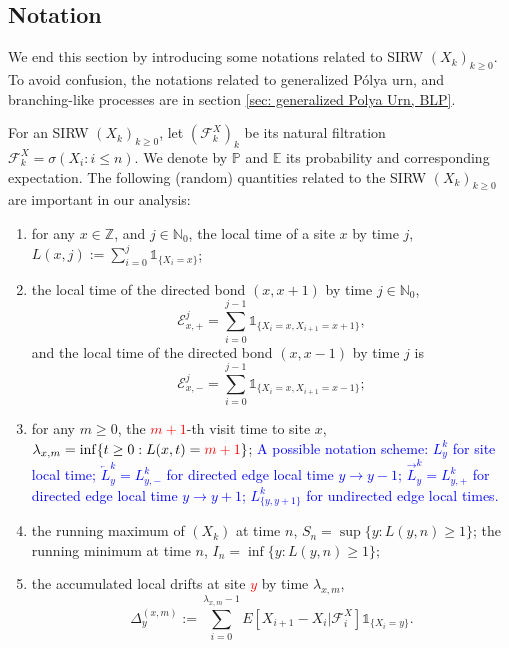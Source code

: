 \documentclass[twoside,12pt,a4paper]{article}
\numberwithin{equation}{section}
\newcommand{\edt}[1]{\textcolor{red}{#1}} %
\newcommand{\comment}[1]{\textcolor{blue}{#1}}
\begin{document}
	\subsection{Notation}
	
	We end this section by introducing some notations related to SIRW $(X_k)_{k\geq 0}$. To avoid confusion, the notations related to generalized P\'{o}lya urn, and branching-like processes are in section \ref{sec: generalized Polya Urn, BLP}.
	
	For an SIRW $(X_k)_{k\geq 0}$,  let $(\mathcal{F}^X_k)_k$ be its natural filtration $\mathcal{F}^X_k = \sigma\left(X_i: i\leq n \right).$ We denote by $\mathbb{P}$ and $\mathbb{E}$ its probability and corresponding expectation. The following (random) quantities related to the SIRW $(X_k)_{k\geq0}$ are important in our analysis:
	\begin{enumerate}
		\item for any $x \in \mathbb{Z}$, and $j\in \mathbb{N}_0$, the local time of a site $x$ by time $j$, $L(x,j):= \sum_{i=0}^j \mathbb{1}_{\{X_i=x\} }$; %
		
		\item the local time of the directed bond $(x,x+1)$ by time $j\in \mathbb{N}_0$,
		$$ \mathcal{E}^j_{x,+} = \sum_{i=0}^{j-1} \mathbb{1}_{\{X_i=x, X_{i+1} =x+1 \} } ,$$
		and the local time of the directed bond $(x,x-1)$ by time $j$ is 
		$$ \mathcal{E}^j_{x,-} = \sum_{i=0}^{j-1} \mathbb{1}_{\{X_i=x, X_{i+1} =x-1 \} }; $$
		
		
		\item for any $m\geq 0$, the \edt{$m+1$}-th visit time to site $x$, $\lambda_{x,m} = \inf\{t \geq 0: L(x,t) = \edt{m+1} \}$;
			\comment{A possible notation scheme: $L_y^k$ for site local time; $\overleftarrow{L}_y^k = L_{y, -}^k$ for directed edge local time $y \to y-1$; $\overrightarrow{L}_y^k = L_{y, +}^k$ for directed edge local time  $y \to y+1$; $L_{\{y, y+1\}}^k $ for undirected edge local times.}
		
		\item the running maximum of $(X_k)$ at time $n$, $S_n= \sup\{y: L(y,n)\geq 1 \} $; the running minimum at time $n$, $I_n= \inf\{y: L(y,n)\geq 1 \} $;
		
		\item 
		the accumulated local drifts at site \edt{$y$} by time $\lambda_{x,m}$, 
		\begin{equation}\label{eq: accumulated local drift}
			\Delta_y^{(x,m)}:= \sum_{i=0}^{\lambda_{x,m}-1} E[X_{i+1}-X_i\vert \mathcal{F}_{i}^X] \mathbb{1}_{\{X_i=y\}}.
		\end{equation}
	\end{enumerate}
\end{document}

